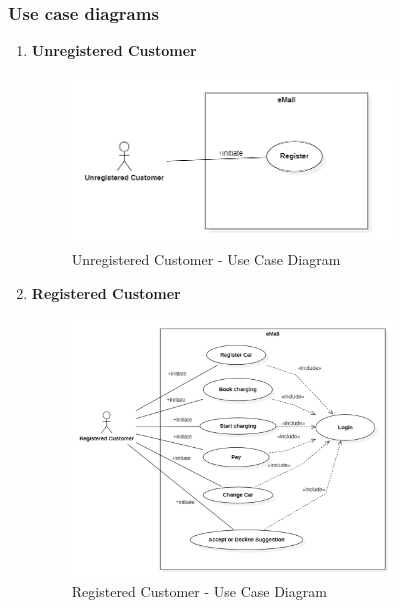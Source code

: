 \subsubsection{Use case diagrams}
\begin{enumerate}
    \item \textbf{Unregistered Customer}
    \begin{figure}[H]
        \begin{center}
            \includegraphics[width=0.8\textwidth]{img/Unregistered_customer.PNG}
            \caption{Unregistered Customer - Use Case Diagram}
        \end{center}
    \end{figure}

    \item \textbf{Registered Customer}
    \begin{figure}[H]
        \begin{center}
            \includegraphics[width=0.8\textwidth]{img/Registered_customer.PNG}
            \caption{Registered Customer - Use Case Diagram}
        \end{center}
    \end{figure}


\end{enumerate}
